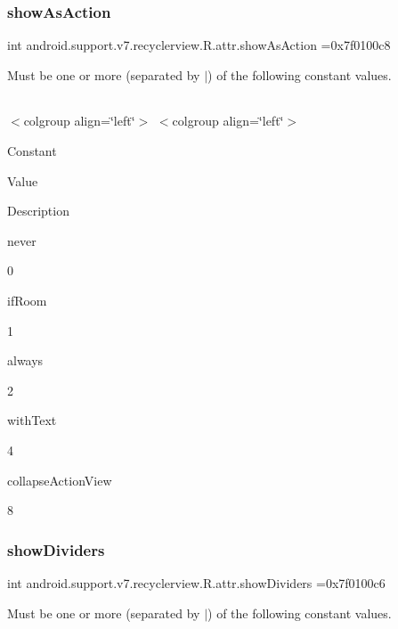 \subsubsection{\texorpdfstring{show\+As\+Action}{showAsAction}}
{\footnotesize\ttfamily int android.\+support.\+v7.\+recyclerview.\+R.\+attr.\+show\+As\+Action =0x7f0100c8\hspace{0.3cm}{\ttfamily [static]}}

Must be one or more (separated by \textquotesingle{}$\vert$\textquotesingle{}) of the following constant values.

\tabulinesep=1mm
\begin{longtabu} spread 0pt [c]{*{0}{|X[-1]}|}
\hline
\end{longtabu}
$<$colgroup align=\char`\"{}left\char`\"{}$>$ $<$colgroup align=\char`\"{}left\char`\"{}$>$ 

Constant

Value

Description 

{\ttfamily never}

0

{\ttfamily if\+Room}

1

{\ttfamily always}

2

{\ttfamily with\+Text}

4

{\ttfamily collapse\+Action\+View}

8\mbox{\label{classandroid_1_1support_1_1v7_1_1recyclerview_1_1R_1_1attr_abaef1bd896974c2ecb7c4410e32e5989}} 
\subsubsection{\texorpdfstring{show\+Dividers}{showDividers}}
{\footnotesize\ttfamily int android.\+support.\+v7.\+recyclerview.\+R.\+attr.\+show\+Dividers =0x7f0100c6\hspace{0.3cm}{\ttfamily [static]}}

Must be one or more (separated by \textquotesingle{}$\vert$\textquotesingle{}) of the following constant values.

